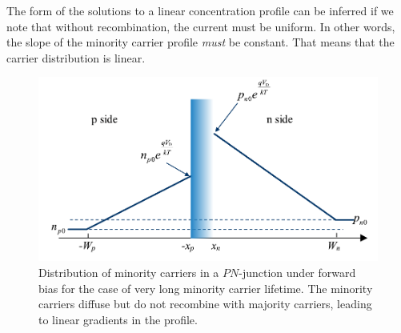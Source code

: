 The form of the solutions to a linear concentration profile can be inferred if we note that without recombination, the current must be uniform.  In other words, the slope of the minority carrier profile \emph{must} be constant. That means that the carrier distribution is linear.
\begin{figure}[H]
\centering
\includegraphics[width=.72\columnwidth]{slide42}
\caption{Distribution of minority carriers in a $PN$-junction under forward bias for the case of very long minority carrier lifetime.  The minority carriers diffuse but do not recombine with majority carriers, leading to linear gradients in the profile.}
\label{fig:slide42}
\end{figure}
\newpage
